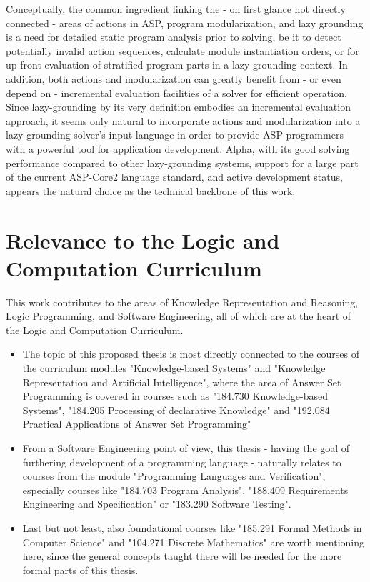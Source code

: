\documentclass[12pt, letterpaper, twoside]{scrartcl}
\begin{document}
Conceptually, the common ingredient linking the - on first glance not directly connected - areas of actions in ASP, program modularization, and lazy grounding is a need for detailed static program analysis prior to solving, be it to detect potentially invalid action sequences, calculate module instantiation orders, or for up-front evaluation of stratified program parts in a lazy-grounding context. In addition, both actions and modularization can greatly benefit from - or even depend on - incremental evaluation facilities of a solver for efficient operation. Since lazy-grounding by its very definition embodies an incremental evaluation approach, it seems only natural to incorporate actions and modularization into a lazy-grounding solver's input language in order to provide ASP programmers with a powerful tool for application development. Alpha, with its good solving performance compared to other lazy-grounding systems, support for a large part of the current ASP-Core2 language standard, and active development status, appears the natural choice as the technical backbone of this work.

\section{Relevance to the Logic and Computation Curriculum}

This work contributes to the areas of Knowledge Representation and Reasoning, Logic Programming, and Software Engineering, all of which are at the heart of the Logic and Computation Curriculum.
\begin{itemize}
	\item The topic of this proposed thesis is most directly connected to the courses of the curriculum modules "Knowledge-based Systems" and "Knowledge Representation and Artificial Intelligence", where the area of Answer Set Programming is covered in courses such as "184.730 Knowledge-based Systems", "184.205 Processing of declarative Knowledge" and "192.084 Practical Applications of Answer Set Programming"
	\item From a Software Engineering point of view, this thesis - having the goal of furthering development of a programming language - naturally relates to courses from the module "Programming Languages and Verification", especially courses like "184.703 Program Analysis", "188.409 Requirements Engineering and Specification" or "183.290 Software Testing".
	\item Last but not least, also foundational courses like "185.291 Formal Methods in Computer Science" and "104.271 Discrete Mathematics" are worth mentioning here, since the general concepts taught there will be needed for the more formal parts of this thesis.
\end{itemize}




\end{document}
